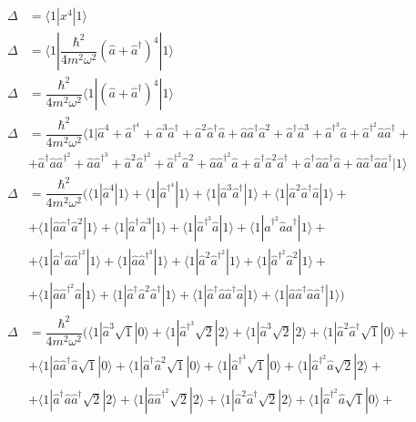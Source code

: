 \documentclass[a4paper,12pt]{article}
\begin{document}
\begin{align*}
\Delta &= \langle 1|x^4|1\rangle\\
\Delta &= \langle 1|\dfrac{\hbar^2}{4m^2\omega^2}(\hat{a} + \hat{a}^\dag)^4|1\rangle\\
\Delta &= \dfrac{\hbar^2}{4m^2\omega^2}\langle 1|(\hat{a} + \hat{a}^\dag)^4|1\rangle\\
\Delta &= \dfrac{\hbar^2}{4m^2\omega^2}\langle 1|\hat{a}^4+\hat{a}^\dag^4+\hat{a}^3\hat{a}^\dag+\hat{a}^2\hat{a}^\dag\hat{a}+\hat{a}\hat{a}^\dag\hat{a}^2+\hat{a}^\dag\hat{a}^3+\hat{a}^\dag^3\hat{a}+\hat{a}^\dag^2\hat{a}\hat{a}^\dag+\\
&+\hat{a}^\dag\hat{a}\hat{a}^\dag^2+\hat{a}\hat{a}^\dag^3+\hat{a}^2\hat{a}^\dag^2+\hat{a}^\dag^2\hat{a}^2+\hat{a}\hat{a}^\dag^2\hat{a}+\hat{a}^\dag\hat{a}^2\hat{a}^\dag+\hat{a}^\dag\hat{a}\hat{a}^\dag\hat{a}+\hat{a}\hat{a}^\dag\hat{a}\hat{a}^\dag|1\rangle\\
\Delta &= \dfrac{\hbar^2}{4m^2\omega^2}\Big(\langle 1|\hat{a}^4|1\rangle+\langle 1|\hat{a}^\dag^4|1\rangle+\langle 1|\hat{a}^3\hat{a}^\dag|1\rangle+\langle 1|\hat{a}^2\hat{a}^\dag\hat{a}|1\rangle+\\
&+\langle 1|\hat{a}\hat{a}^\dag\hat{a}^2|1\rangle+\langle 1|\hat{a}^\dag\hat{a}^3|1\rangle+\langle 1|\hat{a}^\dag^3\hat{a}|1\rangle+\langle 1|\hat{a}^\dag^2\hat{a}\hat{a}^\dag|1\rangle+\\
&+\langle 1|\hat{a}^\dag\hat{a}\hat{a}^\dag^2|1\rangle+\langle 1|\hat{a}\hat{a}^\dag^3|1\rangle+\langle 1|\hat{a}^2\hat{a}^\dag^2|1\rangle+\langle 1|\hat{a}^\dag^2\hat{a}^2|1\rangle+\\
&+\langle 1|\hat{a}\hat{a}^\dag^2\hat{a}|1\rangle+\langle 1|\hat{a}^\dag\hat{a}^2\hat{a}^\dag|1\rangle+\langle 1|\hat{a}^\dag\hat{a}\hat{a}^\dag\hat{a}|1\rangle+\langle 1|\hat{a}\hat{a}^\dag\hat{a}\hat{a}^\dag|1\rangle\Big)\\
\Delta &= \dfrac{\hbar^2}{4m^2\omega^2}\Big(\langle 1|\hat{a}^3\sqrt{1}|0\rangle+\langle 1|\hat{a}^\dag^3\sqrt{2}|2\rangle+\langle 1|\hat{a}^3\sqrt{2}|2\rangle+\langle 1|\hat{a}^2\hat{a}^\dag\sqrt{1}|0\rangle+\\
&+\langle 1|\hat{a}\hat{a}^\dag\hat{a}\sqrt{1}|0\rangle+\langle 1|\hat{a}^\dag\hat{a}^2\sqrt{1}|0\rangle+\langle 1|\hat{a}^\dag^3\sqrt{1}|0\rangle+\langle 1|\hat{a}^\dag^2\hat{a}\sqrt{2}|2\rangle+\\
&+\langle 1|\hat{a}^\dag\hat{a}\hat{a}^\dag\sqrt{2}|2\rangle+\langle 1|\hat{a}\hat{a}^\dag^2\sqrt{2}|2\rangle+\langle 1|\hat{a}^2\hat{a}^\dag\sqrt{2}|2\rangle+\langle 1|\hat{a}^\dag^2\hat{a}\sqrt{1}|0\rangle+\\

\end{align*}
\end{document}
